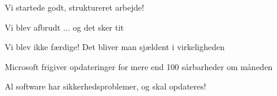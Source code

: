 \documentclass[Screen16to9,17pt]{foils}
\begin{document}

\begin{list2}
\item Vi startede godt, struktureret arbejde!
\item Vi blev afbrudt ... og det sker tit
\item Vi blev ikke færdige! Det bliver man sjældent i virkeligheden
\item Microsoft frigiver opdateringer for mere end 100 sårbarheder om måneden
\item Al software har sikkerhedsproblemer, og skal opdateres!
\end{list2}



\hlkprofiluk
\end{document}
